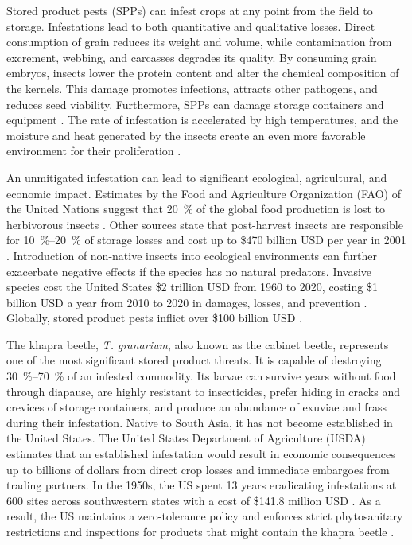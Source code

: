 Stored product pests (SPPs) can infest crops at any point from the field to storage. Infestations lead to both quantitative and qualitative losses. Direct consumption of grain reduces its weight and volume, while contamination from excrement, webbing, and carcasses degrades its quality. By consuming grain embryos, insects lower the protein content and alter the chemical composition of the kernels. This damage promotes infections, attracts other pathogens, and reduces seed viability. Furthermore, SPPs can damage storage containers and equipment \cite{devipriyar.InsectPestDetection2022}. The rate of infestation is accelerated by high temperatures, and the moisture and heat generated by the insects create an even more favorable environment for their proliferation \cite{muller-blenkleMethodAcousticStorage2023}.

An unmitigated infestation can lead to significant ecological, agricultural, and economic impact. Estimates by the Food and Agriculture Organization (FAO) of the United Nations suggest that \SI{20}{\percent} of the global food production is lost to herbivorous insects \cite{mohamedn.sallamInsectDamagePostHarvest2013}. Other sources state that post-harvest insects are responsible for \SIrange{10}{20}{\percent} of storage losses \cite{phillipsBiorationalApproachesManaging2010,gogiToxicityRepellencePlant2016} and cost up to \$470 billion USD per year in 2001 \cite{aliSustainableManagementInsect2023}. Introduction of non-native insects into ecological environments can further exacerbate negative effects if the species has no natural predators. Invasive species cost the United States \$2 trillion USD from 1960 to 2020, costing \$1 billion USD a year from 2010 to 2020 in damages, losses, and prevention \cite{fantle-lepczykEconomicCostsBiological2022}. Globally, stored product pests inflict over \$100 billion USD \cite{harmanIncreasingGlobalRisk2025}.

The khapra beetle, \textit{T. granarium}, also known as the cabinet beetle, represents one of the most significant stored product threats. It is capable of destroying \SIrange{30}{70}{\percent} of an infested commodity. Its larvae can survive years without food through diapause, are highly resistant to insecticides, prefer hiding in cracks and crevices of storage containers, and produce an abundance of exuviae and frass during their infestation. Native to South Asia, it has not become established in the United States. The United States Department of Agriculture (USDA) estimates that an established infestation would result in economic consequences up to billions of dollars from direct crop losses and immediate embargoes from trading partners. In the 1950s, the US spent 13 years eradicating infestations at 600 sites across southwestern states with a cost of \$141.8 million USD \cite{harmanIncreasingGlobalRisk2025}. As a result, the US maintains a zero-tolerance policy and enforces strict phytosanitary restrictions and inspections for products that might contain the khapra beetle \cite{u.s.departmentofagricultureanimalandplanthealthinspectionserviceKhapraBeetleProgram2022}.

